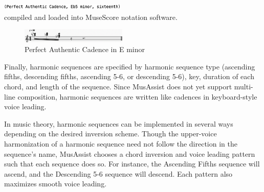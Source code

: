 \documentclass{article}
\begin{document}
\vspace{1mm}
\noindent\includegraphics[width=0.45\textwidth]{images/perfauth_code}\\
\vspace{-2mm}
\noindent compiled and loaded into MuseScore notation software.
\vspace{-1mm}
\begin{figure}[h!]
\centering
\includegraphics[width=0.45\textwidth]{images/perfauth}
  \caption{Perfect Authentic Cadence in E\musFlat\; minor \label{fig:perfauth}}
  \vspace{-3mm}
\end{figure}

Finally, harmonic sequences are specified by harmonic sequence type (ascending fifths, descending fifths, ascending 5-6, or descending 5-6), key, duration of each chord, and length of the sequence. Since MusAssist does not yet support multi-line composition, harmonic sequences are written like cadences in keyboard-style voice leading.

In music theory, harmonic sequences can be implemented in several ways depending on the desired inversion scheme. Though the upper-voice harmonization of a harmonic sequence need not follow the direction in the sequence’s name, MusAssist chooses a chord inversion and voice leading pattern such that each sequence does so. For instance, the Ascending Fifths sequence will ascend, and the Descending 5-6 sequence will descend. Each pattern also maximizes smooth voice leading. 
\end{document}
